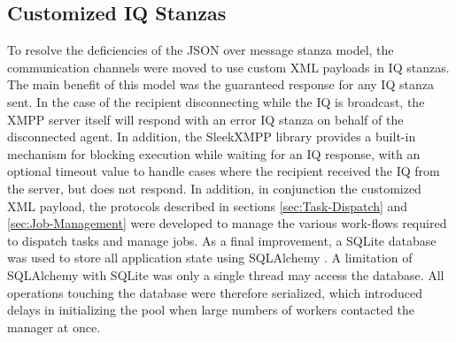 \subsection{Customized IQ Stanzas}
To resolve the deficiencies of the JSON over message stanza model, the
communication channels were moved to use custom XML payloads in IQ stanzas.
The main benefit of this model was the guaranteed response for any IQ stanza
sent. In the case of the recipient disconnecting while the IQ is broadcast,
the XMPP server itself will respond with an error IQ stanza on behalf of the
disconnected agent. In addition, the SleekXMPP library provides a built-in
mechanism for blocking execution while waiting for an IQ response, with an
optional timeout value to handle cases where the recipient received the IQ from
the server, but does not respond. In addition, in conjunction the customized
XML payload, the protocols described in sections \ref{sec:Task-Dispatch} and
\ref{sec:Job-Management} were developed to manage the various work-flows
required to dispatch tasks and manage jobs. As a final improvement, a SQLite
\cite{SQLite} database was used to store all application state using SQLAlchemy
\cite{SQLAlchemy}. A limitation of SQLAlchemy with SQLite was only a single
thread may access the database. All operations touching the database were
therefore serialized, which introduced delays in initializing the pool when
large numbers of workers contacted the manager at once.
